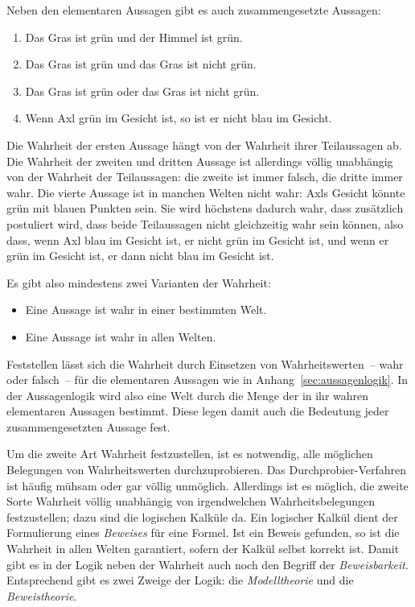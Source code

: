 Neben den elementaren
Aussagen
gibt es auch zusammengesetzte Aussagen:
%
\begin{enumerate}
\item Das Gras ist grün und der Himmel ist grün.
\item Das Gras ist grün und das Gras ist nicht grün.
\item Das Gras ist grün oder das Gras ist nicht grün.
\item Wenn Axl grün im Gesicht ist, so ist er nicht blau im Gesicht.
\end{enumerate}
%
Die Wahrheit der ersten Aussage hängt von der Wahrheit ihrer
Teilaussagen ab.  Die Wahrheit der zweiten und dritten Aussage ist
allerdings völlig unabhängig von der Wahrheit der Teilaussagen: die
zweite ist immer falsch, die dritte immer wahr.  Die vierte Aussage
ist in manchen Welten nicht wahr: Axls Gesicht könnte grün mit
blauen Punkten sein.  Sie wird höchstens dadurch wahr, dass zusätzlich postuliert
wird, dass beide Teilaussagen nicht gleichzeitig wahr sein können,
also dass, wenn Axl blau im Gesicht ist, er nicht grün im Gesicht ist,
und wenn er grün im Gesicht ist, er dann nicht blau im Gesicht ist.

Es gibt also mindestens zwei Varianten der Wahrheit:
%
\begin{itemize}
\item Eine Aussage ist wahr in einer bestimmten Welt.
\item Eine Aussage ist wahr in allen Welten.
\end{itemize}
%
Feststellen lässt sich die Wahrheit durch Einsetzen von
Wahrheitswerten~-- wahr oder falsch~--
für die elementaren Aussagen wie in
Anhang~\ref{sec:aussagenlogik}.  In der
Aussagenlogik wird also eine Welt durch die Menge der in ihr wahren
elementaren Aussagen bestimmt.  Diese legen damit auch die Bedeutung jeder
zusammengesetzten Aussage fest.

Um die
zweite Art Wahrheit festzustellen, ist es notwendig, alle möglichen
Belegungen von Wahrheitswerten durchzuprobieren.  
Das Durchprobier-Verfahren ist häufig mühsam oder gar völlig unmöglich.  
Allerdings ist es möglich, die zweite Sorte Wahrheit völlig
unabhängig von irgendwelchen Wahrheitsbelegungen festzustellen; dazu
sind die logischen Kalküle da.  Ein logischer Kalkül dient der
Formulierung eines \textit{Beweises} für eine Formel.  Ist ein Beweis
gefunden, so ist die Wahrheit in allen Welten garantiert, sofern der Kalkül
selbst korrekt ist.  Damit gibt
es in der Logik neben der Wahrheit auch noch den Begriff der
\textit{Beweisbarkeit}.  Entsprechend gibt es zwei Zweige der Logik:
die \textit{Modelltheorie} und die \textit{Beweistheorie}.

